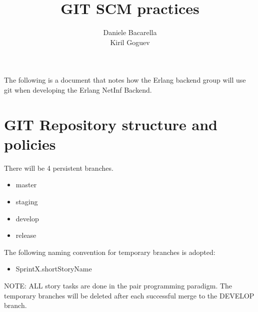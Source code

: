 \documentclass[11pt]{report}
\title{\textbf{GIT SCM practices}}
\author{Daniele Bacarella\\Kiril Goguev}
\date{}
\begin{document}
\maketitle

The following is a document that notes how the Erlang backend group will use git when developing the Erlang NetInf Backend. 

\tableofcontents


\chapter{GIT Repository structure and policies}

There will be 4 persistent branches.
\begin{itemize}
\item master
\item staging
\item develop
\item release
\end{itemize}

The following naming convention for temporary branches is adopted: 

\begin{itemize}
\item SprintX.shortStoryName
\end{itemize}



NOTE: ALL story tasks are done in the pair programming paradigm. The temporary branches will be deleted after each successful merge to the DEVELOP branch.
\end{document}

